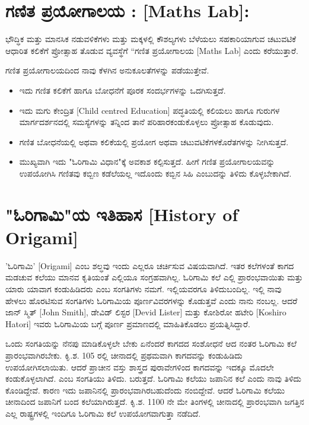  \section*{ಗಣಿತ ಪ್ರಯೋಗಾಲಯ : [Maths Lab]:} ಭೌದ್ಧಿಕ ಮತ್ತು ಮಾನಸಿಕ ನಡುವಳಿಕೆಗಳು ಮತ್ತು ಮಕ್ಕಳಲ್ಲಿ ಕೌಶಲ್ಯಗಳು ಬೆಳೆಯಲು ಸಹಕಾರಿಯಾಗುವ ಚಟುವಟಿಕೆ ಆಧಾರಿತ ಕಲಿಕೆಗೆ ಪ್ರೋತ್ಸಾಹ ತೊಡುವ ವ್ಯವಸ್ಥೆಗೆ ``ಗಣಿತ ಪ್ರಯೋಗಾಲಯ [Maths Lab] ಎಂದು ಕರೆಯುತ್ತಾರೆ. 
 
 ಗಣಿತ ಪ್ರಯೋಗಾಲಯದಿಂದ ನಾವು ಕೆಳಗಿನ ಅನುಕೂಲತೆಗಳನ್ನು ಪಡೆಯುತ್ತೇವೆ.
 \begin{itemize}
 \item ಇದು ಗಣಿತ ಕಲಿಕೆಗೆ ಹಾಗೂ ಬೋಧನೆಗೆ ಪೂರಕ ಸಂದರ್ಭಗಳನ್ನು ಒದಗಿಸುತ್ತದೆ.
 \item ಇದು ಮಗು ಕೇಂದ್ರಿತ [Child centred Education] ಪದ್ಧತಿಯಲ್ಲಿ ಕಲಿಯಲು ಹಾಗೂ ಗುರುಗಳ ಮಾರ್ಗದರ್ಶನದಲ್ಲಿ ಸಮಸ್ಯೆಗಳನ್ನು ತನ್ನಿಂದ ತಾನೆ ಪರಿಹಾರ\break ಕಂಡುಕೊಳ್ಳಲು ಪ್ರೋತ್ಸಾಹ ಕೊಡುವುದು. 
 \item ಗಣಿತ ಬೋಧನೆಯಲ್ಲಿ ಅಥವಾ ಕಲಿಕೆಯಲ್ಲಿ ಪ್ರಯೋಗ ಅಥವಾ ಚಟುವಟಿಕೆಗಳ\break	 ಕೊರೆತಗಳನ್ನು ನೀಗಿಸುತ್ತದೆ. 
 \item ಮುಖ್ಯವಾಗಿ ಇದು "ಓರಿಗಾಮಿ ವಿಧಾನ"ಕ್ಕೆ ಅವಕಾಶ ಕಲ್ಪಿಸುತ್ತದೆ. ಹೀಗೆ ಗಣಿತ ಪ್ರಯೋಗಾಲಯವನ್ನು ಉಪಯೋಗಿಸಿ ಗಣಿತವು ಕಬ್ಬಿಣ ಕಡೆಲೆಯಲ್ಲ ಇದೊಂದು ಕಬ್ಬಿನ ಸಿಹಿ ಎಂಬುದನ್ನು ತಿಳಿದು ಕೊಳ್ಳಬೇಕಾಗಿದೆ. 
 \end{itemize}

\section*{"ಓರಿಗಾಮಿ"ಯ ಇತಿಹಾಸ [History of Origami]}
'ಓರಿಗಾಮಿ' [Origami] ಎಂಬ ಶಲ್ಧವು ಇಂದು ಎಲ್ಲರೂ ಚರ್ಚಿಸುವ ವಿಷಯವಾಗಿದೆ. ಇತರ ಕಲೆಗಳಂತೆ ಕಾಗದ ಮಡಚುವ ಕಲೆಯು ಮಾನವ ಕೃತಿಯಂತೆ ಎಲ್ಲಿಯೂ ಸಂಗ್ರಹವಾಗಿಲ್ಲ. ಓರಿಗಾಮಿ ಕಲೆ ಎಲ್ಲಿ ಪ್ರಾರಂಭವಾಯಿತು ಮತ್ತು ಯಾರು ಯಾವಾಗ ಕಂಡುಹಿಡಿದರು ಎಂಬ ಸಂಗತಿಗಳು ನಮಗೆ. ಇಲ್ಲಿಯವರಗೂ ತಿಳಿದುಬಂದಿಲ್ಲ. ಇಲ್ಲಿ ನಾವು ಹೇಳಲು ಹೊರಟಿಸುವ ಸಂಗತಿಗಳು ಓರಿಗಾಮಿಯ ಪೂರ್ಣವಿವರಗಳನ್ನು ಕೊಡುತ್ತವೆ ಎಂದು ನಾನು ನಂಬಲ್ಲ. ಆದರೆ ಜಾನ್ ಸ್ಮಿತ್ [John Smith], ಡೇವಿಡ್ ಲಿಸ್ಟರ [Devid Lister] ಮತ್ತು ಕೋಶಿರೋ ಹಟೇರಿ [Koshiro Hatori] ಇವರು ಓರಿಗಾಮಿಯ ಬಗ್ಗೆ ಪೂರ್ಣ ಪ್ರಮಾಣದಲ್ಲಿ ಮಾಹಿತಿಕೊಡಲು ಪ್ರಯತ್ನಿಸಿದ್ದಾರೆ. 


ಒಂದು ಸಂಗತಿಯನ್ನು ನೆನಪು ಮಾಡಿಕೊಳ್ಳಲೇ ಬೇಕು ಏನೆಂದರೆ ಕಾಗದದ ಸಂಶೋಧನೆ ಆದ ನಂತರ ಓರಿಗಾಮಿ ಕಲೆ ಪ್ರಾರಂಭವಾಗಿರಬೇಕು. ಕಿೃ.ಶ. 105 ರಲ್ಲಿ ಚೀನಾದಲ್ಲಿ ಪ್ರಥಮವಾಗಿ ಕಾಗದವನ್ನು ಕಂಡುಹಿಡಿದು ಉಪಯೋಗಿಸಲಾಯಿತು. ಆದರೆ ಪ್ರಾಚೀನ ವಸ್ತು ಶಾಸ್ತ್ರದ ಪುರಾವೇಗಳಿಂದ ಕಾಗದವನ್ನು ಇದಕ್ಕೂ ಮೊದಲೇ ಕಂಡುಕೊಳ್ಳಲಾಗಿದೆ. ಎಂಬ ಸಂಗತಿಯು ತಿಳಿದು. ಬರುತ್ತದೆ. ಓರಿಗಾಮಿ ಕಲೆಯು ಜಪಾನಿನ ಕಲೆ ಎಂದು ನಾವು ತಿಳಿದು ಕೊಂಡಿದ್ದೇವೆ. ಕಾರಣ ಇದು ಜಪಾನಿನಲ್ಲಿ ಪ್ರಾರಂಭವಾಗಿರಬಹುದೆಂದು ನಂಬಿದ್ದೇವೆ. ಆದರೆ ಓರಿಗಾಮಿ ಕಲೆಯು ಚೀನಾದಿಂದ ಜಪಾನಿಗೆ ಬಂದ ಕಲೆಯಾಗಿರುತ್ತದೆ. ಕಿೃ.ಶ. 1100 ನೇ ಮೇ ತಿಂಗಳಲ್ಲಿ ಚೀನಾದಲ್ಲಿ ಪ್ರಾರಂಭವಾಗಿ ಜಗತ್ತಿನ ಎಲ್ಲ ರಾಷ್ಟ್ರಗಳಲ್ಲಿ  ಇಂದಿಗೂ ಓರಿಗಾಮಿ ಕಲೆ ಉಪಯೋಗವಾಗುತ್ತಾ ನಡೆದಿದೆ. 


